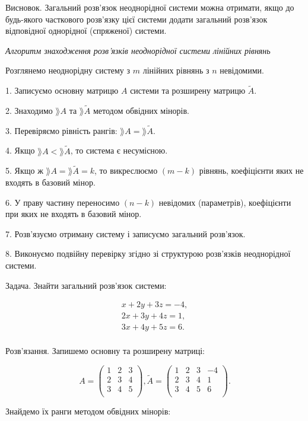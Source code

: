 Висновок. Загальний розв’язок неоднорідної системи можна отримати, якщо
до будь-якого часткового розв’язку цієї системи додати загальний розв’язок
відповідної однорідної (спряженої) системи.


\textit{Алгоритм знаходження розв’язків неоднорідної системи лінійних рівнянь}


Розглянемо неоднорідну систему з $m$ лінійних рівнянь з $n$ невідомими.

1. Записуємо основну матрицю $A$ системи та розширену матрицю $\tilde{A}$.

2. Знаходимо $\rang A$ та $\rang \tilde{A}$ методом обвідних мінорів.

3. Перевіряємо рівність рангів: $\rang A = \rang \tilde{A}$.

4. Якщо $\rang A < \rang \tilde{A}$, то система є несумісною.

5. Якщо ж $\rang A = \rang \tilde{A} = k$, то викреслюємо $(m - k)$ рівнянь, коефіцієнти яких
не входять в базовий мінор.

6. У праву частину переносимо $(n - k)$ невідомих (параметрів), коефіцієнти при
яких не входять в базовий мінор.

7. Розв’язуємо отриману систему і записуємо загальний розв’язок.

8. Виконуємо подвійну перевірку згідно зі структурою розв’язків неоднорідної
системи.


Задача. Знайти загальний розв’язок системи:

$$\begin{matrix}
	x + 2y + 3z = -4, \\
	2x + 3y + 4z = 1, \\
	3x + 4y + 5z = 6. \\
\end{matrix}$$

Розв’язання. Запишемо основну та розширену матриці:

$$A = \begin{pmatrix}
	1 & 2 & 3 \\
	2 & 3 & 4 \\
	3 & 4 & 5 \\
\end{pmatrix}, \tilde{A} = \begin{pmatrix}
	1 & 2 & 3 & -4 \\
	2 & 3 & 4 & 1 \\
	3 & 4 & 5 & 6 \\
\end{pmatrix}.$$

Знайдемо їх ранги методом обвідних мінорів:

